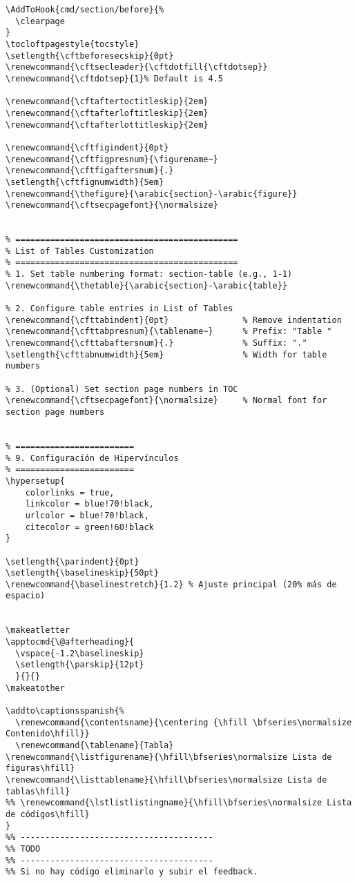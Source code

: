 \documentclass{reporti}
\begin{document}
\begin{verbatim}
\AddToHook{cmd/section/before}{%
  \clearpage
}
\tocloftpagestyle{tocstyle}
\setlength{\cftbeforesecskip}{0pt}
\renewcommand{\cftsecleader}{\cftdotfill{\cftdotsep}}
\renewcommand{\cftdotsep}{1}% Default is 4.5

\renewcommand{\cftaftertoctitleskip}{2em}
\renewcommand{\cftafterloftitleskip}{2em}
\renewcommand{\cftafterlottitleskip}{2em}

\renewcommand{\cftfigindent}{0pt}
\renewcommand{\cftfigpresnum}{\figurename~}
\renewcommand{\cftfigaftersnum}{.}
\setlength{\cftfignumwidth}{5em}
\renewcommand{\thefigure}{\arabic{section}-\arabic{figure}}
\renewcommand{\cftsecpagefont}{\normalsize}


% =============================================
% List of Tables Customization
% =============================================
% 1. Set table numbering format: section-table (e.g., 1-1)
\renewcommand{\thetable}{\arabic{section}-\arabic{table}}

% 2. Configure table entries in List of Tables
\renewcommand{\cfttabindent}{0pt}               % Remove indentation
\renewcommand{\cfttabpresnum}{\tablename~}      % Prefix: "Table "
\renewcommand{\cfttabaftersnum}{.}              % Suffix: "."
\setlength{\cfttabnumwidth}{5em}                % Width for table numbers

% 3. (Optional) Set section page numbers in TOC
\renewcommand{\cftsecpagefont}{\normalsize}     % Normal font for section page numbers


% ========================
% 9. Configuración de Hipervínculos
% ========================
\hypersetup{
    colorlinks = true,
    linkcolor = blue!70!black,
    urlcolor = blue!70!black,
    citecolor = green!60!black
}

\setlength{\parindent}{0pt}
\setlength{\baselineskip}{50pt}
\renewcommand{\baselinestretch}{1.2} % Ajuste principal (20% más de espacio)


\makeatletter
\apptocmd{\@afterheading}{
  \vspace{-1.2\baselineskip}
  \setlength{\parskip}{12pt}
  }{}{}
\makeatother

\addto\captionsspanish{%
  \renewcommand{\contentsname}{\centering {\hfill \bfseries\normalsize Contenido\hfill}}
  \renewcommand{\tablename}{Tabla}
\renewcommand{\listfigurename}{\hfill\bfseries\normalsize Lista de figuras\hfill}
\renewcommand{\listtablename}{\hfill\bfseries\normalsize Lista de tablas\hfill}
%% \renewcommand{\lstlistlistingname}{\hfill\bfseries\normalsize Lista de códigos\hfill}
}
%% ---------------------------------------
%% TODO
%% ---------------------------------------
%% Si no hay código eliminarlo y subir el feedback.
\end{verbatim}
\end{document}
